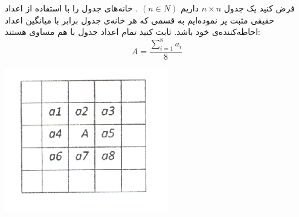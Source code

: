 \EXERCISE
فرض کنید یک جدول
$n \times n$
داریم
$(n \in N)$
. خانه‌های جدول را با استفاده از اعداد حقیقی مثبت پر نموده‌ایم به قسمی که هر خانه‌ی جدول برابر با میانگین اعداد احاطه‌کننده‌ی خود باشد. ثابت کنید تمام اعداد جدول با هم مساوی هستند:
$$A = \frac{\sum_{i=1}^{8} a_i}{8}$$
    \begin{center}
     	\includegraphics[scale=0.2]{./12.png}
    \end{center}